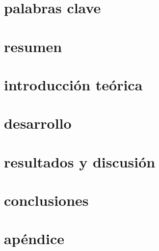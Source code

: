 

 



\section*{palabras clave}

\section*{resumen}

\newpage

\tableofcontents
\newpage

\section*{introducción teórica}

\newpage

\section*{desarrollo}

\newpage

\section*{resultados y discusión}

\newpage

\section*{conclusiones}

\newpage

%
%

\section*{apéndice}



